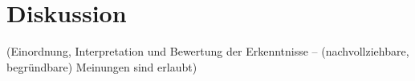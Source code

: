 \section{Diskussion}

(Einordnung, Interpretation und Bewertung der Erkenntnisse -- (nachvollziehbare, begründbare) Meinungen sind erlaubt)


